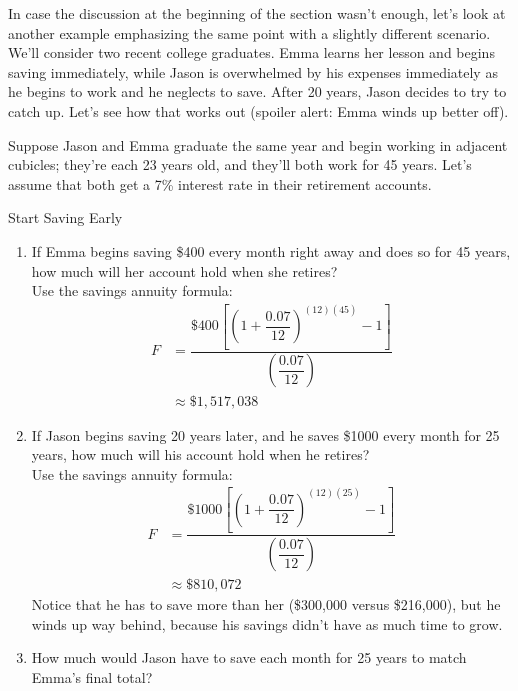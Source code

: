 In case the discussion at the beginning of the section wasn't enough, let's look at another example emphasizing the same point with a slightly different scenario.  We'll consider two recent college graduates.  Emma learns her lesson and begins saving immediately, while Jason is overwhelmed by his expenses immediately as he begins to work and he neglects to save.  After 20 years, Jason decides to try to catch up.  Let's see how that works out (spoiler alert: Emma winds up better off).

Suppose Jason and Emma graduate the same year and begin working in adjacent cubicles; they're each 23 years old, and they'll both work for 45 years.  Let's assume that both get a 7\% interest rate in their retirement accounts. 

\begin{example}[https://www.youtube.com/watch?v=9hcZL9uCEoY&list=PLfmpjsIzhztsZtnb7HnXrQ8SLoiOCIcAM&index=28]{Start Saving Early}
\begin{enumerate}[(1)]
\item If Emma begins saving \$400 every month right away and does so for 45 years, how much will her account hold when she retires?\\

Use the savings annuity formula:
\begin{align*}
F &= \dfrac{\$400\left[\left(1+\dfrac{0.07}{12}\right)^{(12)(45)}-1\right]}{\left(\dfrac{0.07}{12}\right)}\\
&\approx \boxed{\$1,517,038}
\end{align*}

\item If Jason begins saving 20 years later, and he saves \$1000 every month for 25 years, how much will his account hold when he retires?\\

Use the savings annuity formula:
\begin{align*}
F &= \dfrac{\$1000\left[\left(1+\dfrac{0.07}{12}\right)^{(12)(25)}-1\right]}{\left(\dfrac{0.07}{12}\right)}\\
&\approx \boxed{\$810,072}
\end{align*}
Notice that he has to save more than her (\$300,000 versus \$216,000), but he winds up way behind, because his savings didn't have as much time to grow.

\item How much would Jason have to save each month for 25 years to match Emma's final total?\\


\end{enumerate}
\end{example}
